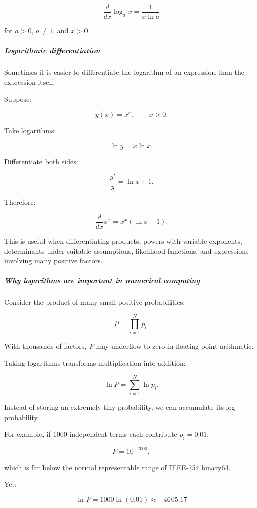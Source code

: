 \[
\boxed{\frac d{dx}\log_a x=\frac1{x\ln a}}
\]

for \(a>0\), \(a\ne1\), and \(x>0\).

\subparagraph{Logarithmic differentiation}\label{01-foundations-i-ch020-logarithmic-differentiation}

\hypertarget{01-foundations-i-ch020-logarithmic-differentiation}{}

Sometimes it is easier to differentiate the logarithm of an expression than the expression itself.

Suppose:

\[
y(x)=x^x,\qquad x>0.
\]

Take logarithms:

\[
\ln y=x\ln x.
\]

Differentiate both sides:

\[
\frac{y'}y=\ln x+1.
\]

Therefore:

\[
\boxed{\frac d{dx}x^x=x^x(\ln x+1)}.
\]

This is useful when differentiating products, powers with variable exponents, determinants under suitable assumptions, likelihood functions, and expressions involving many positive factors.

\subparagraph{Why logarithms are important in numerical computing}\label{01-foundations-i-ch020-why-logarithms-are-important-in-numerical-computing}

\hypertarget{01-foundations-i-ch020-why-logarithms-are-important-in-numerical-computing}{}

Consider the product of many small positive probabilities:

\[
P=\prod_{i=1}^{N}p_i.
\]

With thousands of factors, \(P\) may underflow to zero in floating-point arithmetic.

Taking logarithms transforms multiplication into addition:

\[
\ln P=\sum_{i=1}^{N}\ln p_i.
\]

Instead of storing an extremely tiny probability, we can accumulate its log-probability.

For example, if \(1000\) independent terms each contribute \(p_i=0.01\):

\[
P=10^{-2000},
\]

which is far below the normal representable range of IEEE-754 binary64.

Yet:

\[
\ln P=1000\ln(0.01)\approx-4605.17
\]

